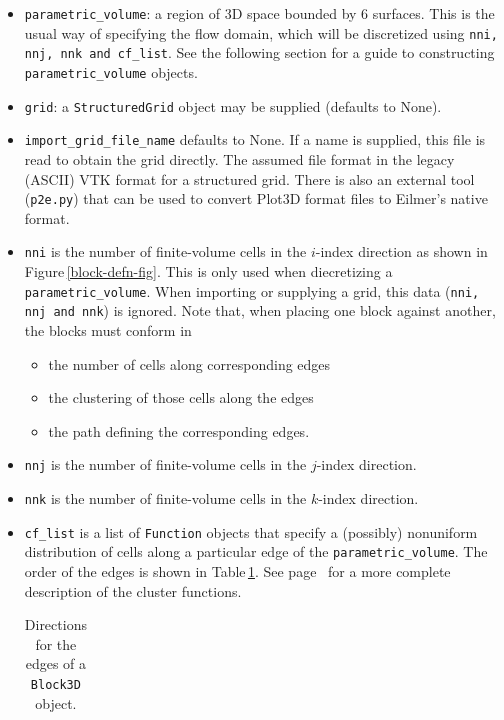 \documentclass[12pt,a4paper,twoside]{article}
\begin{document}
\begin{itemize}
\item \texttt{parametric\_volume}: a region of 3D space bounded by 6 surfaces.
    This is the usual way of specifying the flow domain, which will be discretized 
    using \texttt{nni, nnj, nnk and cf\_list}.
    See the following section for a guide to constructing \texttt{parametric\_volume} objects.
\item \texttt{grid}: a \texttt{StructuredGrid} object may be supplied (defaults to None). 
\item \texttt{import\_grid\_file\_name} defaults to None.
  If a name is supplied, this file is read to obtain the grid directly.
  The assumed file format in the legacy (ASCII) VTK format for a structured grid.
  There is also an external tool (\texttt{p2e.py}) that can be used to convert
  Plot3D format files to Eilmer's native format.
\item \texttt{nni} is the number of finite-volume cells in the $i$-index
  direction as shown in Figure\,\ref{block-defn-fig}.
  This is only used when diecretizing a \texttt{parametric\_volume}.
  When importing or supplying a grid, this data (\texttt{nni, nnj and nnk}) is ignored.
  Note that, when placing one block against another, the blocks must conform in
  \begin{itemize}
    \item the number of cells along corresponding edges
    \item the clustering of those cells along the edges
    \item the path defining the corresponding edges.
  \end{itemize}
\item \texttt{nnj} is the number of finite-volume cells in the $j$-index direction.
\item \texttt{nnk} is the number of finite-volume cells in the $k$-index direction.
\item \texttt{cf\_list} is a list of \texttt{Function} objects
  that specify a (possibly) nonuniform distribution of cells along a
  particular edge of the \texttt{parametric\_volume}.
  The order of the edges is shown in Table\,\ref{edge-list-table}.
  See page~\pageref{cflist-item} for a more complete description of the cluster functions.
\begin{table}
  \caption{Directions for the edges of a \texttt{Block3D} object.}
  \label{edge-list-table}
  \begin{center}
    \begin{tabular}{cccl}

\end{tabular}
\end{center}
\end{table}
\end{itemize}
\end{document}
